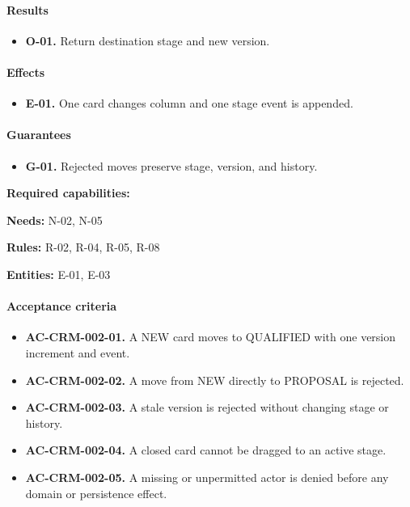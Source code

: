 \documentclass[10pt,a4paper]{article}
\begin{document}
\paragraph{Results}

\begin{itemize}

\item \textbf{O-01.} Return destination stage and new version.

\end{itemize}

\paragraph{Effects}

\begin{itemize}

\item \textbf{E-01.} One card changes column and one stage event is appended.

\end{itemize}

\paragraph{Guarantees}

\begin{itemize}

\item \textbf{G-01.} Rejected moves preserve stage, version, and history.

\end{itemize}

\textbf{Required capabilities:} 

\textbf{Needs:} N-02, N-05

\textbf{Rules:} R-02, R-04, R-05, R-08

\textbf{Entities:} E-01, E-03

\paragraph{Acceptance criteria}

\begin{itemize}

\item \textbf{AC-CRM-002-01.} A NEW card moves to QUALIFIED with one version increment and event.

\item \textbf{AC-CRM-002-02.} A move from NEW directly to PROPOSAL is rejected.

\item \textbf{AC-CRM-002-03.} A stale version is rejected without changing stage or history.

\item \textbf{AC-CRM-002-04.} A closed card cannot be dragged to an active stage.

\item \textbf{AC-CRM-002-05.} A missing or unpermitted actor is denied before any domain or persistence effect.

\end{itemize}
\end{document}
